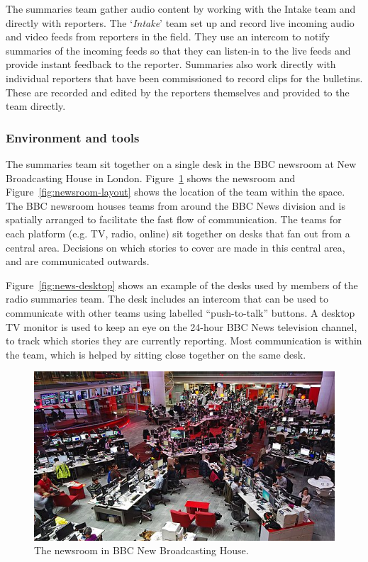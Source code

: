 The summaries team gather audio content by working with the Intake team and directly with reporters. The
`\textit{Intake}' team set up and record live incoming audio and video feeds from reporters in the field. They use an
intercom to notify summaries of the incoming feeds so that they can listen-in to the live feeds and provide instant
feedback to the reporter.  Summaries also work directly with individual reporters that have been commissioned to record
clips for the bulletins. These are recorded and edited by the reporters themselves and provided to the team directly.

\subsubsection{Environment and tools}
The summaries team sit together on a single desk in the BBC newsroom at New Broadcasting House in London.
Figure~\ref{fig:newsroom} shows the newsroom and Figure~\ref{fig:newsroom-layout} shows the location of the team within
the space. The BBC newsroom houses teams from around the BBC News division and is spatially arranged to facilitate the
fast flow of communication. The teams for each platform (e.g. TV, radio, online) sit together on desks that fan out
from a central area. Decisions on which stories to cover are made in this central area, and are communicated outwards.

Figure~\ref{fig:news-desktop} shows an example of the desks used by members of the radio summaries team. The desk
includes an intercom that can be used to communicate with other teams using labelled ``push-to-talk'' buttons. A
desktop TV monitor is used to keep an eye on the 24-hour BBC News television channel, to track which stories they are
currently reporting. Most communication is within the team, which is helped by sitting close together on the same desk.

\begin{figure}
  \centering
  \includegraphics[width=\columnwidth]{figs/newsroom.jpg}
  \caption{The newsroom in BBC New Broadcasting House.}
  \label{fig:newsroom}
\end{figure}

